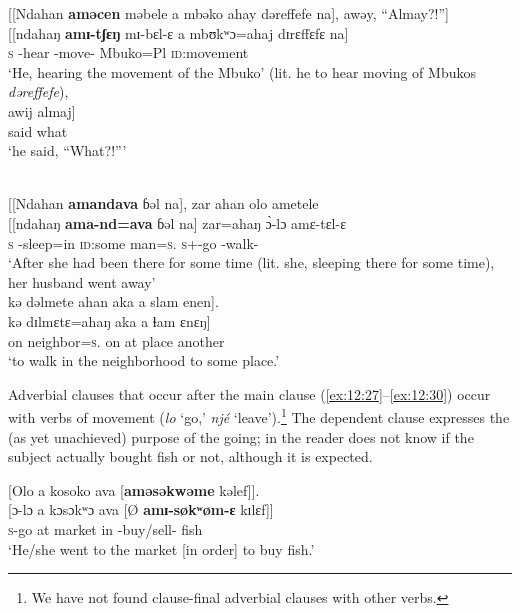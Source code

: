 \ea \label{ex:12:25}
{}[[Ndahan  \textbf{aməcen} məbele  a  mbəko  ahay  dəreffefe  na],  awəy, “Almay?!”]\\
\gll  {}[[ndahaŋ  \textbf{amɪ-tʃɛŋ} mɪ-bɛl-ɛ    a  mbʊkʷɔ=ahaj  dɪrɛffɛfɛ    na]\\  
 \hspaceThis{[[}\textsc{s} {\DEP}-hear  {\NOM}{}-move-{\CL}  {\GEN}  Mbuko=Pl  \textsc{id}:movement  {\PSP}\\  
 \glt ‘He, hearing the movement of the Mbuko' (lit. he to hear moving of Mbukos \textit{dəreffefe}),\\
 
 \medskip
 \gll awij  almaj]\\
      {said}  what\\
\glt  ‘he said, “What?!”’ 
\z 

\ea \label{ex:12:26}
\\
{}[[Ndahan  \textbf{amandava}  ɓəl  na],  zar  ahan  olo  ametele\\  
\gll  {}[[ndahaŋ  \textbf{ama-nd=ava}  ɓəl  na]  zar=ahaŋ  \`{ɔ}-lɔ amɛ-tɛl-ɛ\\ 
    \hspaceThis{[[}\textsc{s}         {\DEP}-sleep=in    \textsc{id}:some  {\PSP}  man=\textsc{s}.{\POSS}  \textsc{s}+{\PFV}-go   {\DEP}-walk-{\CL}\\      
\glt ‘After she had been there for some time (lit. she, sleeping there for some time), her husband went away’\\

\medskip
kə  dəlmete  ahan  aka  a  slam  enen].\\
\gll kə dɪlmɛtɛ=ahaŋ  aka a ɬam ɛnɛŋ]\\
     on   neighbor=\textsc{s}.{\POSS}  on   at   place   another\\
\glt  ‘to walk in the neighborhood to some place.’
\z 

Adverbial clauses that occur after the main clause (\ref{ex:12:27}--\ref{ex:12:30}) occur with verbs of movement (\textit{lo} ‘go,’ \textit{njé} ‘leave’).\footnote{We have not found clause-final adverbial clauses with other verbs.} The dependent clause expresses the (as yet unachieved) purpose of the going; in  the reader does not know if the subject actually bought fish or not, although it is expected. 

\ea \label{ex:12:27}
{}[Olo  a  kosoko  ava  [\textbf{aməsəkwəme} kəlef]].\\
\gll  {}[ɔ-lɔ a   kɔsɔkʷɔ   ava   [Ø  \textbf{amɪ-søkʷøm-ɛ}   kɪlɛf]]\\
      \textsc{s}-go  at  market  in  {}  {\DEP}-buy/sell-{\CL}  fish\\
\glt  ‘He/she went to the market [in order] to buy fish.’
\z 

